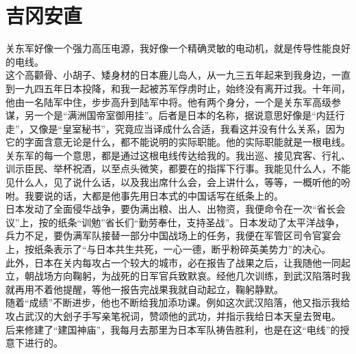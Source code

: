 \fancyhead[RO]{} %
\fancyhead[LE]{} %
\chapter*{吉冈安直}
\thispagestyle{empty}
关东军好像一个强力高压电源，我好像一个精确灵敏的电动机，就是传导性能良好的电线。\\

这个高颧骨、小胡子、矮身材的日本鹿儿岛人，从一九三五年起来到我身边，一直到一九四五年日本投降，和我一起被苏军俘虏时止，始终没有离开过我。十年间，他由一名陆军中住，步步高升到陆军中将。他有两个身分，一个是关东军高级参谋，另一个是“满洲国帝室御用挂”。后者是日本的名称，据说意思好像是“内廷行走”，又像是“皇室秘书”，究竟应当译成什么合适，我看这并没有什么关系，因为它的字面含意无论是什么，都不能说明的实际职能。他的实际职能就是一根电线。关东军的每一个意思，都是通过这根电线传达给我的。我出巡、接见宾客、行礼、训示臣民、举杯祝酒，以至点头微笑，都要在的指挥下行事。我能见什么人，不能见什么人，见了说什么话，以及我出席什么会，会上讲什么，等等，一概听他的吩咐。我要说的话，大都是他事先用日本式的中国话写在纸条上的。\\

日本发动了全面侵华战争，要伪满出粮、出人、出物资，我便命令在一次“省长会议”上，按的纸条“训勉”省长们“勤劳奉仕，支持圣战”。日本发动了太平洋战争，兵力不足，要伪满军队接替一部分中国战场上的任务，我便在军管区司令官宴会上，按纸条表示了“与日本共生共死，一心一德，断乎粉碎英美势力”的决心。\\

此外，日本在关内每攻占一个较大的城市，必在报告了战果之后，让我随他一同起立，朝战场方向鞠躬，为战死的日军官兵致默哀。经他几次训练，到武汉陷落时我就再用不着他提醒，等他一报告完战果我就自动起立，鞠躬静默。\\

随着“成绩”不断进步，他也不断给我加添功课。例如这次武汉陷落，他又指示我给攻占武汉的大刽子手写亲笔祝词，赞颂他的武功，并指示我给日本天皇去贺电。\\

后来修建了“建国神庙”，我每月去那里为日本军队祷告胜利，也是在这“电线”的授意下进行的。\\


